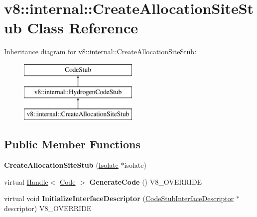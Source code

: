\hypertarget{classv8_1_1internal_1_1_create_allocation_site_stub}{}\section{v8\+:\+:internal\+:\+:Create\+Allocation\+Site\+Stub Class Reference}
\label{classv8_1_1internal_1_1_create_allocation_site_stub}
Inheritance diagram for v8\+:\+:internal\+:\+:Create\+Allocation\+Site\+Stub\+:\begin{figure}[H]
\begin{center}
\leavevmode
\includegraphics[height=3.000000cm]{classv8_1_1internal_1_1_create_allocation_site_stub}
\end{center}
\end{figure}
\subsection*{Public Member Functions}
\begin{DoxyCompactItemize}
\item 
\hypertarget{classv8_1_1internal_1_1_create_allocation_site_stub_a2cac23344adfceefcfd0169163a7f2fc}{}{\bfseries Create\+Allocation\+Site\+Stub} (\hyperlink{classv8_1_1internal_1_1_isolate}{Isolate} $\ast$isolate)\label{classv8_1_1internal_1_1_create_allocation_site_stub_a2cac23344adfceefcfd0169163a7f2fc}

\item 
\hypertarget{classv8_1_1internal_1_1_create_allocation_site_stub_afc0d934e29a0e9ae672fa731f8d56289}{}virtual \hyperlink{classv8_1_1internal_1_1_handle}{Handle}$<$ \hyperlink{classv8_1_1internal_1_1_code}{Code} $>$ {\bfseries Generate\+Code} () V8\+\_\+\+O\+V\+E\+R\+R\+I\+D\+E\label{classv8_1_1internal_1_1_create_allocation_site_stub_afc0d934e29a0e9ae672fa731f8d56289}

\item 
\hypertarget{classv8_1_1internal_1_1_create_allocation_site_stub_a780abaf9545cb74990a497d4c47f0985}{}virtual void {\bfseries Initialize\+Interface\+Descriptor} (\hyperlink{classv8_1_1internal_1_1_code_stub_interface_descriptor}{Code\+Stub\+Interface\+Descriptor} $\ast$descriptor) V8\+\_\+\+O\+V\+E\+R\+R\+I\+D\+E\label{classv8_1_1internal_1_1_create_allocation_site_stub_a780abaf9545cb74990a497d4c47f0985}

\end{DoxyCompactItemize}

